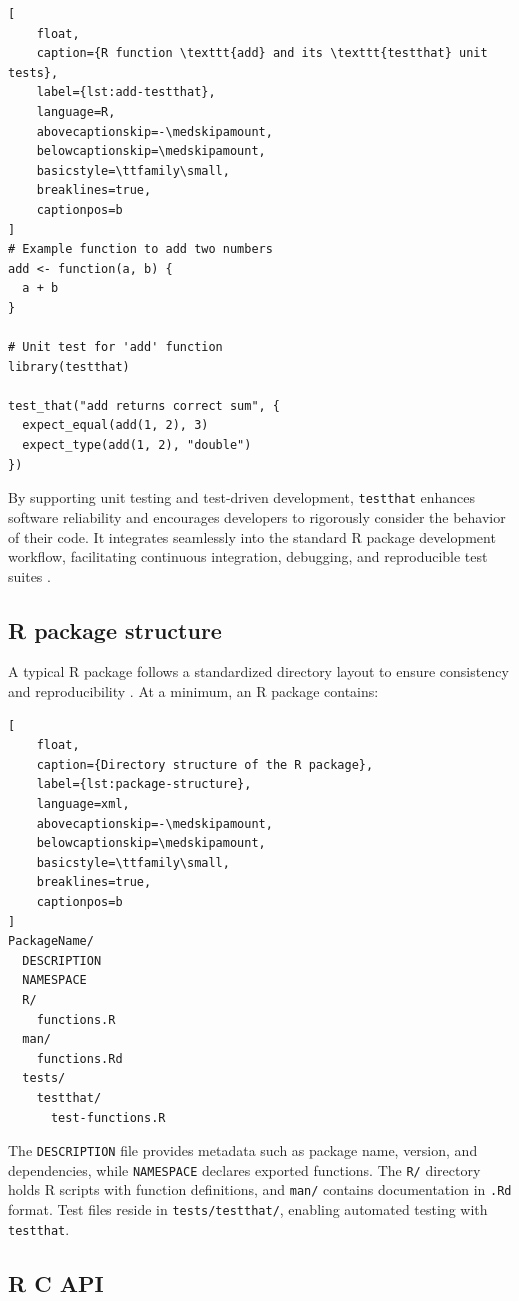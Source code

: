 \begin{lstlisting}[
    float,
    caption={R function \texttt{add} and its \texttt{testthat} unit tests},
    label={lst:add-testthat},
    language=R,
    abovecaptionskip=-\medskipamount,
    belowcaptionskip=\medskipamount,
    basicstyle=\ttfamily\small,
    breaklines=true,
    captionpos=b
]
# Example function to add two numbers
add <- function(a, b) {
  a + b
}

# Unit test for 'add' function
library(testthat)

test_that("add returns correct sum", {
  expect_equal(add(1, 2), 3)
  expect_type(add(1, 2), "double")
})
\end{lstlisting}


By supporting unit testing and test-driven development, \texttt{testthat} enhances software reliability and encourages developers to rigorously consider the behavior of their code. It integrates seamlessly into the standard R package development workflow, facilitating continuous integration, debugging, and reproducible test suites \cite{wickham2015rpackages}.

\subsection{R package structure}

A typical R package follows a standardized directory layout to ensure consistency and reproducibility \cite{wickham2015rpackages}. At a minimum, an R package contains:

\begin{lstlisting}[
    float,
    caption={Directory structure of the R package},
    label={lst:package-structure},
    language=xml,
    abovecaptionskip=-\medskipamount,
    belowcaptionskip=\medskipamount,
    basicstyle=\ttfamily\small,
    breaklines=true,
    captionpos=b
]
PackageName/
  DESCRIPTION
  NAMESPACE
  R/
    functions.R
  man/
    functions.Rd
  tests/
    testthat/
      test-functions.R
\end{lstlisting}


The \texttt{DESCRIPTION} file provides metadata such as package name, version, and dependencies, while \texttt{NAMESPACE} declares exported functions. The \texttt{R/} directory holds R scripts with function definitions, and \texttt{man/} contains documentation in \texttt{.Rd} format. Test files reside in \texttt{tests/testthat/}, enabling automated testing with \texttt{testthat}.

\subsection{R C API}

